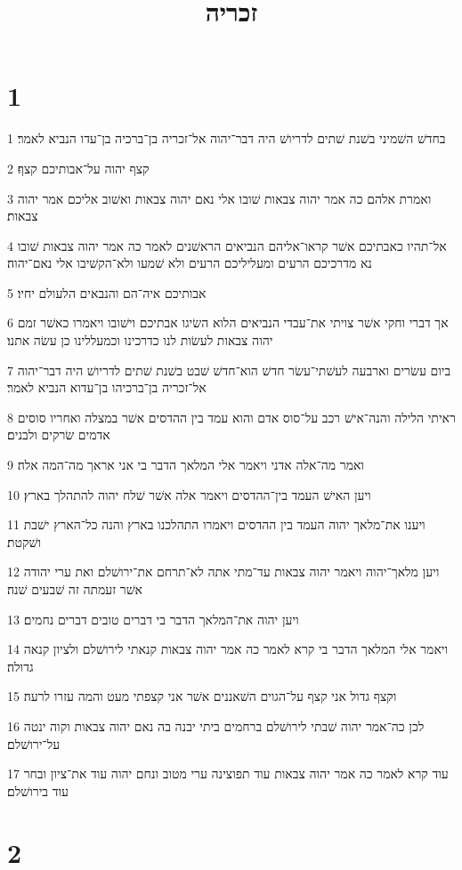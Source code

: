 

\title{זכריה}


\chapter{1}

\par 1 בחדשׁ השׁמיני בשׁנת שׁתים לדריושׁ היה דבר־יהוה אל־זכריה בן־ברכיה בן־עדו הנביא לאמר׃
\par 2 קצף יהוה על־אבותיכם קצף׃
\par 3 ואמרת אלהם כה אמר יהוה צבאות שׁובו אלי נאם יהוה צבאות ואשׁוב אליכם אמר יהוה צבאות׃
\par 4 אל־תהיו כאבתיכם אשׁר קראו־אליהם הנביאים הראשׁנים לאמר כה אמר יהוה צבאות שׁובו נא מדרכיכם הרעים ומעליליכם הרעים ולא שׁמעו ולא־הקשׁיבו אלי נאם־יהוה׃
\par 5 אבותיכם איה־הם והנבאים הלעולם יחיו׃
\par 6 אך דברי וחקי אשׁר צויתי את־עבדי הנביאים הלוא השׂיגו אבתיכם וישׁובו ויאמרו כאשׁר זמם יהוה צבאות לעשׂות לנו כדרכינו וכמעללינו כן עשׂה אתנו׃
\par 7 ביום עשׂרים וארבעה לעשׁתי־עשׂר חדשׁ הוא־חדשׁ שׁבט בשׁנת שׁתים לדריושׁ היה דבר־יהוה אל־זכריה בן־ברכיהו בן־עדוא הנביא לאמר׃
\par 8 ראיתי הלילה והנה־אישׁ רכב על־סוס אדם והוא עמד בין ההדסים אשׁר במצלה ואחריו סוסים אדמים שׂרקים ולבנים׃
\par 9 ואמר מה־אלה אדני ויאמר אלי המלאך הדבר בי אני אראך מה־המה אלה׃
\par 10 ויען האישׁ העמד בין־ההדסים ויאמר אלה אשׁר שׁלח יהוה להתהלך בארץ׃
\par 11 ויענו את־מלאך יהוה העמד בין ההדסים ויאמרו התהלכנו בארץ והנה כל־הארץ ישׁבת ושׁקטת׃
\par 12 ויען מלאך־יהוה ויאמר יהוה צבאות עד־מתי אתה לא־תרחם את־ירושׁלם ואת ערי יהודה אשׁר זעמתה זה שׁבעים שׁנה׃
\par 13 ויען יהוה את־המלאך הדבר בי דברים טובים דברים נחמים׃
\par 14 ויאמר אלי המלאך הדבר בי קרא לאמר כה אמר יהוה צבאות קנאתי לירושׁלם ולציון קנאה גדולה׃
\par 15 וקצף גדול אני קצף על־הגוים השׁאננים אשׁר אני קצפתי מעט והמה עזרו לרעה׃
\par 16 לכן כה־אמר יהוה שׁבתי לירושׁלם ברחמים ביתי יבנה בה נאם יהוה צבאות וקוה ינטה על־ירושׁלם׃
\par 17 עוד קרא לאמר כה אמר יהוה צבאות עוד תפוצינה ערי מטוב ונחם יהוה עוד את־ציון ובחר עוד בירושׁלם׃

\chapter{2}

